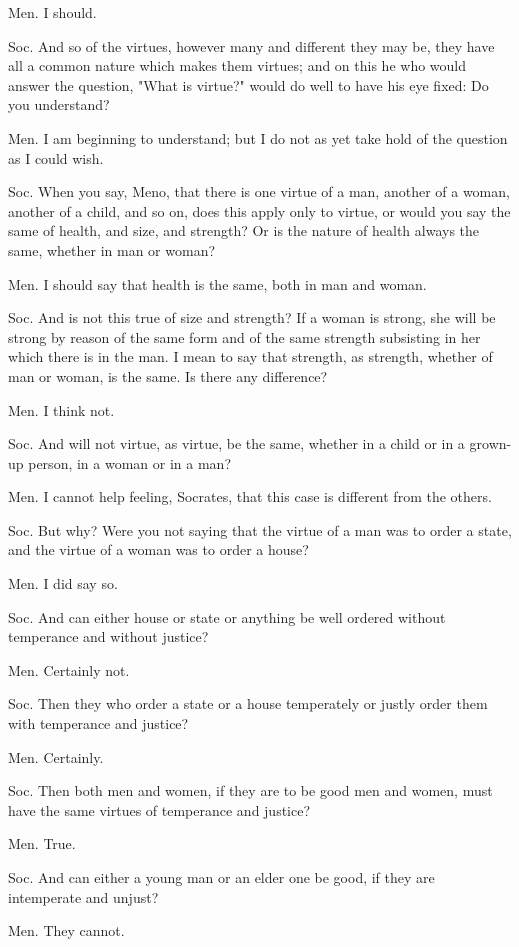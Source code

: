 Men. I should. 

Soc. And so of the virtues, however many and different they may be,
they have all a common nature which makes them virtues; and on this
he who would answer the question, "What is virtue?" would do well
to have his eye fixed: Do you understand? 

Men. I am beginning to understand; but I do not as yet take hold of
the question as I could wish. 

Soc. When you say, Meno, that there is one virtue of a man, another
of a woman, another of a child, and so on, does this apply only to
virtue, or would you say the same of health, and size, and strength?
Or is the nature of health always the same, whether in man or woman?

Men. I should say that health is the same, both in man and woman.

Soc. And is not this true of size and strength? If a woman is strong,
she will be strong by reason of the same form and of the same strength
subsisting in her which there is in the man. I mean to say that strength,
as strength, whether of man or woman, is the same. Is there any difference?

Men. I think not. 

Soc. And will not virtue, as virtue, be the same, whether in a child
or in a grown-up person, in a woman or in a man? 

Men. I cannot help feeling, Socrates, that this case is different
from the others. 

Soc. But why? Were you not saying that the virtue of a man was to
order a state, and the virtue of a woman was to order a house?

Men. I did say so. 

Soc. And can either house or state or anything be well ordered without
temperance and without justice? 

Men. Certainly not. 

Soc. Then they who order a state or a house temperately or justly
order them with temperance and justice? 

Men. Certainly. 

Soc. Then both men and women, if they are to be good men and women,
must have the same virtues of temperance and justice? 

Men. True. 

Soc. And can either a young man or an elder one be good, if they are
intemperate and unjust? 

Men. They cannot. 

